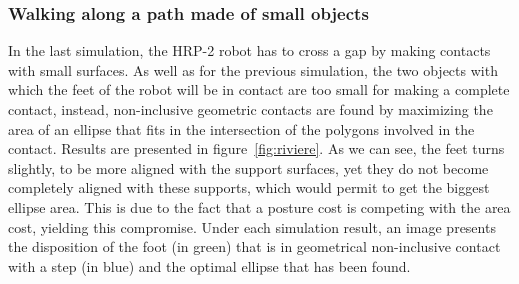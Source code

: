 


\subsubsection{Walking along a path made of small objects}
\label{subsubsec:riviere}


In the last simulation, the HRP-2 robot has to cross a gap by making contacts
with small surfaces.
As well as for the previous simulation, the two objects
with which the feet of the robot will be in contact are too small for making a
complete contact, instead, non-inclusive geometric contacts are found by
maximizing the area of an ellipse that fits in the intersection of the polygons
involved in the contact.
Results are presented in figure~\ref{fig:riviere}.
As we can see, the feet turns slightly, to be more aligned with the support
surfaces, yet they do not become completely aligned with these supports, which would permit to get the biggest ellipse area.
This is due to the fact that a posture cost is competing with the area cost, yielding this compromise.
Under each simulation result, an image presents the disposition of the foot (in green) that is in geometrical non-inclusive contact with a step (in blue) and the optimal ellipse that has been found.

